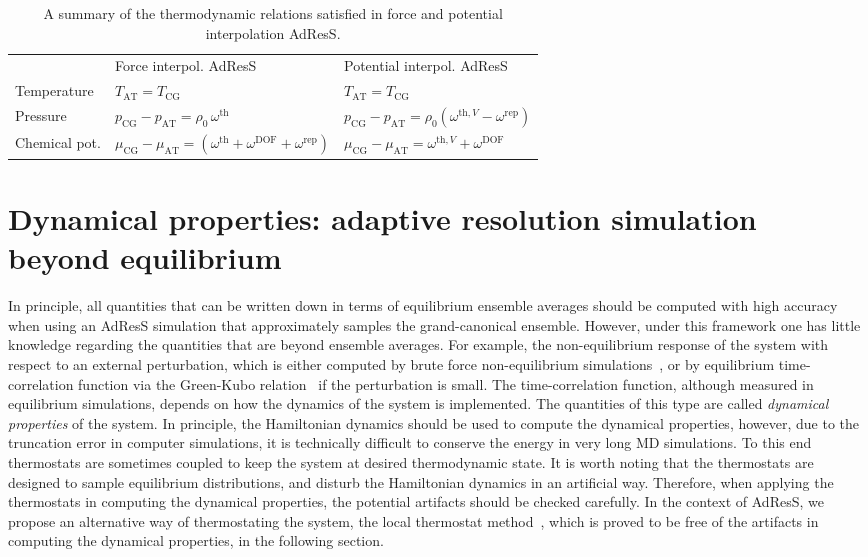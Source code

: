 \documentclass[epjST]{svjour}
\newcommand{\recheck}[1]{{\color{red} #1}}
\newcommand{\AT}[0]{\textrm{AT}}
\newcommand{\CG}[0]{\textrm{CG}}
\newcommand{\thf}{{\textrm{th}}}
\newcommand{\rep}{{\textrm{rep}}}
\newcommand{\dof}{{\textrm{DOF}}}
\begin{document}
\begin{table}
  \centering
  \caption{A summary of the thermodynamic relations satisfied in force and potential interpolation AdResS.}
  \label{tab:thermodynamic}
  \begin{tabular*}{0.99\textwidth}{@{\extracolsep{\fill}}lll}\hline\hline
    &         Force interpol. AdResS     &       Potential interpol. AdResS \\
    Temperature    &   {$T_\AT = T_\CG$}                                                & {$T_\AT = T_\CG$}                                        \\
    Pressure       &   {$p_\CG - p_\AT = \rho_0\, \omega^\thf$}                          & {$p_\CG - p_\AT = \rho_0(\omega^{\thf,V} - \omega^\rep)$} \\
    Chemical pot.  &   {$\mu_\CG - \mu_\AT = (\omega^\thf + \omega^\dof +\omega^\rep)$}   & {$\mu_\CG - \mu_\AT = \omega^{\thf,V}+ \omega^\dof$}      \\\hline\hline
  \end{tabular*}
\end{table}


\section{Dynamical properties: adaptive resolution simulation beyond equilibrium}
\label{sec:dynamical}


In principle, all quantities that
can be written down in terms of equilibrium ensemble averages should
be computed with high accuracy when using an AdResS simulation that approximately samples the grand-canonical ensemble.
However, under this framework one has little knowledge regarding the quantities
that are \recheck{beyond} ensemble averages.
For example, the non-equilibrium response of the system
with respect to an external perturbation, which is 
either computed by brute force non-equilibrium simulations~\cite{wang2014exploring}, or by
equilibrium time-correlation function via the Green-Kubo
relation~\cite{green1954markoff,kubo1957statistical} if the perturbation is small. The
time-correlation function, although measured in equilibrium
simulations, depends on how the dynamics
of the system is implemented.
The quantities of this type are called \emph{dynamical properties} of the system.
In principle, the Hamiltonian dynamics should be used to compute the dynamical properties,
however, due to the truncation error in computer simulations, it
is technically difficult to conserve the energy in very long MD simulations.
To this end thermostats are sometimes coupled to keep the system at desired thermodynamic
state.
It is worth noting that the thermostats are designed to sample equilibrium distributions, and 
disturb the Hamiltonian dynamics in an artificial way.
Therefore, when applying the thermostats
in computing the dynamical properties, the potential artifacts
should be checked carefully.
In the context of AdResS, we propose an alternative way of thermostating
the system, the local thermostat method~\cite{wang2014exploring},
which is proved to be free of the artifacts in computing the dynamical properties, in the following section.
\end{document}
